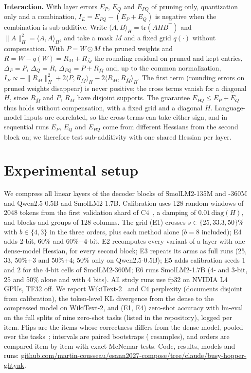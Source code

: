 \documentclass{esannV2}
\newif\ifEthree \Ethreetrue
\newif\ifEfour  \Efourtrue
\newif\ifEfive  \Efivetrue
\newif\ifEsix   \Esixtrue
\begin{document}
\textbf{Interaction.} With layer errors $E_P$, $E_Q$ and $E_{PQ}$ of pruning
only, quantization only and a combination, $I_E=E_{PQ}-(E_P+E_Q)$ is negative
when the combination is sub-additive. Write
$\langle A,B\rangle_H=\mathrm{tr}(AHB^\top)$ and
$\|A\|_H^2=\langle A,A\rangle_H$, and take a mask $M$ and a fixed grid
$q(\cdot)$ without compensation. With $P=W\odot M$ the pruned weights and
$R=W-q(W)=R_M+R_{\bar M}$ the rounding residual on pruned and kept entries,
$\Delta_P=P$, $\Delta_Q=R$, $\Delta_{PQ}=P+R_{\bar M}$ and, up to the common
normalization, $I_E\propto-\|R_M\|_H^2+2\langle P,R_{\bar
M}\rangle_H-2\langle R_M,R_{\bar M}\rangle_H$. The first term (rounding errors
on pruned weights disappear) is never positive; the cross terms vanish for a
diagonal $H$, since $R_{\bar M}$ and $P$, $R_M$ have disjoint supports. The
guarantee $E_{PQ}\le E_P+E_Q$ thus holds without compensation, with a fixed
grid and a diagonal $H$. Language-model inputs are correlated, so the
cross terms can take either sign, and in sequential runs $E_P$, $E_Q$ and
$E_{PQ}$ come from different Hessians from the second block on; we therefore
test sub-additivity with one shared Hessian per layer.

\section{Experimental setup}
\label{sec:setup}

We compress all linear layers of the decoder blocks of SmolLM2-135M and -360M
and Qwen2.5-0.5B\ifEsix{} and SmolLM2-1.7B\fi. Calibration uses 128 random
windows of 2048 tokens from the first validation shard of
C4~\cite{raffel2020t5}, a damping of $0.01\,\overline{\mathrm{diag}(H)}$, and
blocks and groups of 128 columns. The grid (E1) crosses $s\in\{25,33.3,50\}\%$
with $b\in\{4,3\}$ in the three orders, plus each method alone ($b=8$
included)\ifEfour; E4 adds 2-bit, 60\% and 60\%+4-bit\fi. E2 recomputes every
variant of a layer with one dense-model Hessian, for every second
block\ifEthree; E3 repeats its arms as full runs (25, 33, 50\%+3 and
50\%+4; 50\% only on Qwen2.5-0.5B)\fi\ifEfive; E5 adds calibration seeds 1 and 2
for the 4-bit cells of SmolLM2-360M\fi\ifEsix; E6 runs SmolLM2-1.7B (4- and
3-bit, 25 and 50\% alone and with 4 bits)\fi. All study runs use fp32 on
NVIDIA L4 GPUs, TF32 off. We report WikiText-2~\cite{merity2017pointer} and
C4 perplexity (documents disjoint from calibration), the token-level KL divergence from the dense to the compressed
model on WikiText-2, and (E1, E4) zero-shot accuracy with
lm-eval~\cite{gao2026lmeval} on the full splits of nine zero-shot tasks
(listed in the repository), logged per item. Flips are the items whose correctness differs from the dense
model, pooled over the tasks~\cite{dutta2024accuracy}; intervals are paired
bootstraps (\resBootB{} resamples), and orders are compared item by item with
exact McNemar tests. Code, results, models and runs:
\url{github.com/martin-cousseau/esann2027-compose/tree/claude/busy-hopper-ghtynk}.
\end{document}
